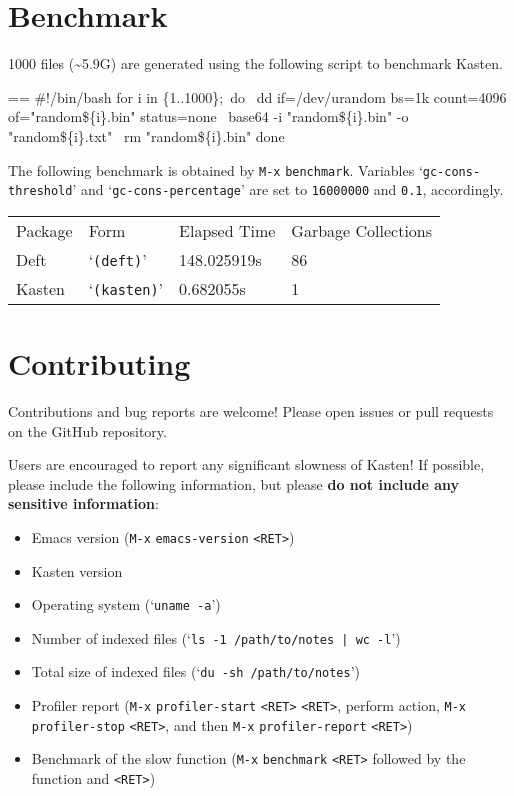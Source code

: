 \documentclass{book}
\makeatletter
\newenvironment{Texinfopreformatted}{%
  \par\GNUTobeylines\obeyspaces\frenchspacing\parskip=\z@\parindent=\z@}{}
{\catcode`\^^M=13 \gdef\GNUTobeylines{\catcode`\^^M=13 \def^^M{\null\par}}}
\newenvironment{Texinfoindented}{\begin{list}{}{}\item\relax}{\end{list}}
\renewcommand{\_}{\Texinfounderscore\discretionary{}{}{}}
\makeatother
\begin{document}
\chapter{{Benchmark}}
\label{anchor:Benchmark}%

1000 files (\~{}5.9G) are generated using the following script to benchmark Kasten.

\begin{Texinfoindented}
\begin{Texinfopreformatted}%
\ttfamily \#!/bin/bash
for i in \{1..1000\};\ do
\    dd if=/dev/urandom bs=1k count=4096 of="random\_\$\{i\}.bin" status=none
\    base64 -i "random\_\$\{i\}.bin" -o "random\_\$\{i\}.txt"
\    rm "random\_\$\{i\}.bin"
done
\end{Texinfopreformatted}
\end{Texinfoindented}

The following benchmark is obtained by \texttt{M-x} \texttt{benchmark}. Variables
`\texttt{gc-cons-threshold}' and `\texttt{gc-cons-percentage}' are set to \texttt{16000000} and \texttt{0.1},
accordingly.

\begin{tabular}{m{} m{} m{} m{}}%
Package&
Form&
Elapsed Time&
Garbage Collections\\
Deft&
`\texttt{(deft)}'&
148.025919s&
86\\
Kasten&
`\texttt{(kasten)}'&
0.682055s&
1\\
\end{tabular}%

\chapter{{Contributing}}
\label{anchor:Contributing}%

Contributions and bug reports are welcome! Please open issues or pull requests
on the GitHub repository.

Users are encouraged to report any significant slowness of Kasten! If possible,
please include the following information, but please \textbf{do not include any
sensitive information}:
\begin{itemize}
\item Emacs version (\texttt{M-x} \texttt{emacs-version} \texttt{<RET>})
\item Kasten version
\item Operating system (`\texttt{uname -a}')
\item Number of indexed files (`\texttt{ls -1 /path/to/notes | wc -l}')
\item Total size of indexed files (`\texttt{du -sh /path/to/notes}')
\item Profiler report (\texttt{M-x} \texttt{profiler-start} \texttt{<RET>} \texttt{<RET>}, perform action,
\texttt{M-x} \texttt{profiler-stop} \texttt{<RET>}, and then \texttt{M-x} \texttt{profiler-report} \texttt{<RET>})
\item Benchmark of the slow function (\texttt{M-x} \texttt{benchmark} \texttt{<RET>} followed by the
function and \texttt{<RET>})
\end{itemize}
\end{document}
